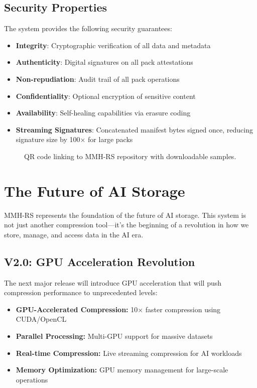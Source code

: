 \documentclass[11pt,a4paper]{article}
\begin{document}
	\subsection{Security Properties}
	
	The system provides the following security guarantees:
	\begin{itemize}
		\item \textbf{Integrity}: Cryptographic verification of all data and metadata
		\item \textbf{Authenticity}: Digital signatures on all pack attestations
		\item \textbf{Non-repudiation}: Audit trail of all pack operations
		\item \textbf{Confidentiality}: Optional encryption of sensitive content
		\item \textbf{Availability}: Self-healing capabilities via erasure coding
		\item \textbf{Streaming Signatures}: Concatenated manifest bytes signed once, reducing signature size by 100× for large packs
	\end{itemize}
	
	\begin{figure}[htbp]
	\centering
	\caption{QR code linking to MMH-RS repository with downloadable samples.}
	\label{fig:repo-qr}
	\end{figure}
	
	\section{The Future of AI Storage}
	\label{sec:future}
	
	MMH-RS represents the foundation of the future of AI storage. This system is not just another compression tool—it's the beginning of a revolution in how we store, manage, and access data in the AI era.
	
	\subsection{V2.0: GPU Acceleration Revolution}
	
	The next major release will introduce GPU acceleration that will push compression performance to unprecedented levels:
	\begin{itemize}
		\item \textbf{GPU-Accelerated Compression:} 10× faster compression using CUDA/OpenCL
		\item \textbf{Parallel Processing:} Multi-GPU support for massive datasets
		\item \textbf{Real-time Compression:} Live streaming compression for AI workloads
		\item \textbf{Memory Optimization:} GPU memory management for large-scale operations
	\end{itemize}
	
\end{document}
